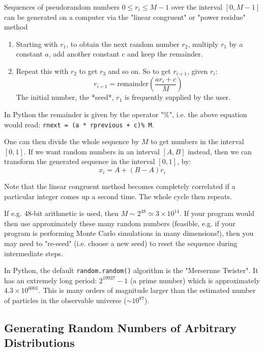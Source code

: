 \documentclass[../../../main.tex]{subfiles}
\begin{document}
Sequences of pseudorandom numbers $0 \leq r_i \leq M-1$ over the interval $[0, M-1]$ can be generated on a computer via the "linear congruent" or "power residue" method
\begin{enumerate}
    \item Starting with $r_1$, to obtain the next random number $r_2$, multiply $r_1$ by a constant $a$, add another constant $c$ and keep the remainder. 
    \item Repeat this with $r_2$ to get $r_3$ and so on. So to get $r_{i+1}$, given $r_i$: 
    \begin{equation*}
        r_{i+1} = \mathrm{remainder} \left( \frac{a r_i + c}{M} \right)
    \end{equation*}
    The initial number, the *seed*, $r_1$ is frequently supplied by the user. 
\end{enumerate}

In Python the remainder is given by the operator "\%", i.e. the above equation would read: \verb|rnext = (a * rprevious + c)% M|. 

One can then divide the whole sequence by $M$ to get numbers in the interval $[0,1]$. 
If we want random numbers in an interval $[A,B]$ instead, then we can transform the generated sequence in the interval $[0,1]$, by:
\begin{equation*}
    x_i = A + (B-A) r_i   
\end{equation*}

Note that the linear congruent method becomes completely correlated if a particular integer comes up a second time. 
The whole cycle then repeats.

If e.g. 48-bit arithmetic is used, then $M \sim 2^{48} \simeq 3\times 10^{14}$. 
If your program would then use approximately these many random numbers (feasible, e.g. if your program is performing Monte Carlo simulations in many dimensions!), then you may need to "re-seed" (i.e. choose a new seed) to reset the sequence during intermediate steps. 

In Python, the default \verb|random.random()| algorithm is the "Mersernne Twister". 
It has an extremely long period: $2^{19937} -1$ (a prime number) which is approximately $4.3 \times 10^{6001}$. 
This is many orders of magnitude larger than the estimated number of particles in the observable universe ($\sim 10^{87}$).

\subsection{Generating Random Numbers of Arbitrary Distributions}
\end{document}
